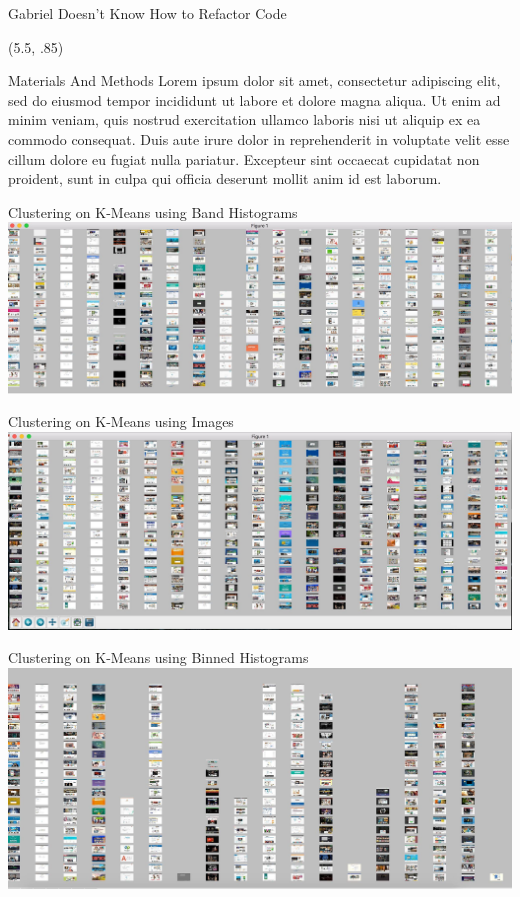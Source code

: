 \documentclass{beamer}
\begin{document}
\begin{frame}{\centerline{\Huge Gabriel Doesn't Know How to Refactor Code}}
\begin{textblock}{5}
\end{textblock}

\begin{textblock}{5}(5.5, .85)
\begin{block}{Materials And Methods}
Lorem ipsum dolor sit amet, consectetur adipiscing elit, sed do eiusmod tempor incididunt ut labore et dolore magna aliqua. Ut enim ad minim veniam, quis nostrud exercitation ullamco laboris nisi ut aliquip ex ea commodo consequat. Duis aute irure dolor in reprehenderit in voluptate velit esse cillum dolore eu fugiat nulla pariatur. Excepteur sint occaecat cupidatat non proident, sunt in culpa qui officia deserunt mollit anim id est laborum.
\end{block}
\begin{block}{Clustering on K-Means using Band Histograms}
\includegraphics[scale=.5]{histkmeans.png}
\end{block}
\begin{block}{Clustering on K-Means using Images}
\includegraphics[scale=.5]{imgkmeans.png}
\end{block}
\begin{block}{Clustering on K-Means using Binned Histograms}
\includegraphics[scale=.5]{binKmeans.jpg}
\end{block}

\end{textblock}
\end{frame}
\end{document}
